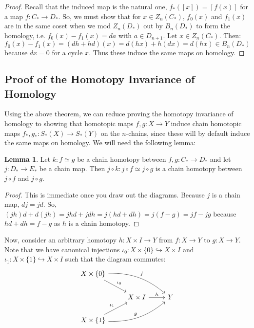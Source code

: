 \documentclass[11pt, oneside]{amsart}   	%
\theoremstyle{definition}
\newtheorem{lemma}[theorem]{Lemma}
\begin{document}
\begin{proof}
	Recall that the induced map is the natural one, $f_*([x]) = [f(x)]$ for a map $f : C_*\rightarrow D_*$. So, we must 
	show that for $x\in Z_n(C_*)$, $f_0(x)$ and $f_1(x)$ are in the same coset when we mod $Z_n(D_*)$ out by $B_n(D_*)$ 
	to form the homology, i.e. $f_0(x) - f_1(x) = da$ with $a\in D_{n + 1}$. Let $x\in Z_n(C_*)$. Then:
	\begin{equation}
		f_0(x) - f_1(x) = (dh + hd)(x) = d(hx) + h(dx) = d(hx)\in B_n(D_*)
	\end{equation}
	because $dx = 0$ for a cycle $x$. Thus these induce the same maps on homology. 
\end{proof}

\subsection{Proof of the Homotopy Invariance of Homology}
Using the above theorem, we can reduce proving the homotopy invariance of homology to showing that homotopic maps $f, g : 
X\rightarrow Y$ induce chain homotopic maps $f_*, g_* : S_*(X)\rightarrow S_*(Y)$ on the $n$-chains, since these will by 
default induce the same maps on homology. We will need the following lemma:
\begin{lemma}
	Let $k : f\simeq g$ be a chain homotopy between $f, g : C_*\rightarrow D_*$ and let $j : D_*\rightarrow E_*$ 
	be a chain map. Then $j\circ k : j\circ f\simeq j\circ g$ is a chain homotopy between $j\circ f$ and $j\circ g$. 
\end{lemma}
\begin{proof}
	This is immediate once you draw out the diagrams. Because $j$ is a chain map, $dj = jd$. So, $(jh)d + d(jh) = 
	jhd + jdh = j(hd + dh) = j(f - g) = jf - jg$ because $hd + dh = f - g$ as $h$ is a chain homotopy. 
\end{proof}

Now, consider an arbitrary homotopy $h : X\times I\rightarrow Y$ from $f : X\rightarrow Y$ to $g : X\rightarrow Y$. Note 
that we have canonical injections $\iota_0 : X\times\{0\}\hookrightarrow X\times I$ and $\iota_1 : X\times \{1\}\hookrightarrow 
X\times I$ such that the diagram commutes:
\[\begin{tikzcd}
	X\times\{0\} \arrow[dr, "\iota_0"] \arrow[drr, "f", bend left=20]&  &  \\
	& X\times I\arrow[r, "h"] & Y \\
	X\times \{1\} \arrow[ur, "\iota_1"] \arrow[urr, "g", bend right=20] & & \\
\end{tikzcd}\]
\end{document}
